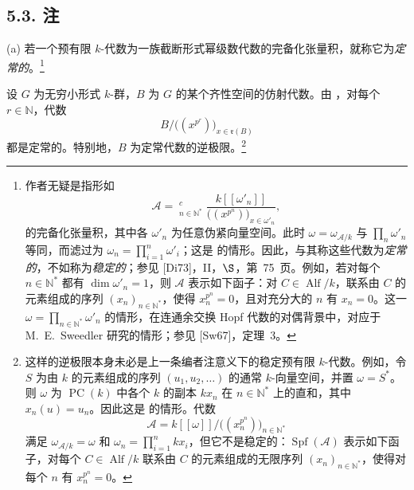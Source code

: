 
\subsection*{5.3. 注}
\label{sga3:VIIB:5.3}

\noindent{}\textup{(a)}
若一个预有限 \(k\)-代数为一族截断形式幂级数代数的完备化张量积，就称它为\emph{定常的}。\footnote{\label{sga3:VIIB:nde:165}作者无疑是指形如
\[
  \mathcal A
  =
  \mathop{\widehat{\bigotimes}}\nolimits^{c}_{n\in\mathbb N^*}
  \frac{k[[\omega'_n]]}
       {\bigl((x^{p^n})\bigr)_{x\in\omega'_n}},
\]
的完备化张量积，其中各 \(\omega'_n\) 为任意伪紧向量空间。此时 \(\omega=\omega_{\mathcal A/k}\) 与 \(\prod_n\omega'_n\) 等同，而滤过为 \(\omega_n=\prod_{i=1}^{n}\omega'_i\)；这是  的情形。因此，与其称这些代数为\emph{定常的}，不如称为\emph{稳定的}；参见 \textup{[Di73]}，II，\(\S\)，第~75~页。例如，若对每个 \(n\in\mathbb N^*\) 都有 \(\dim\omega'_n=1\)，则 \(\mathcal A\) 表示如下函子：对 \(C\in\operatorname{Alf}/k\)，联系由 \(C\) 的元素组成的序列 \((x_n)_{n\in\mathbb N^*}\)，使得 \(x_n^{p^n}=0\)，且对充分大的 \(n\) 有 \(x_n=0\)。这一 \(\omega=\prod_{n\in\mathbb N^*}\omega'_n\) 的情形，在连通余交换 Hopf 代数的对偶背景中，对应于 M.~E.~Sweedler 研究的情形；参见 \textup{[Sw67]}，定理~3。}

设 \(G\) 为无穷小形式 \(k\)-群，\(B\) 为 \(G\) 的某个齐性空间的仿射代数。由 ，对每个 \(r\in\mathbb N\)，代数
\[
  B
  \big/
  \bigl((x^{p^r})\bigr)_{x\in\mathfrak r(B)}
\]
都是定常的。特别地，\(B\) 为定常代数的逆极限。\footnote{\label{sga3:VIIB:nde:166}这样的逆极限本身未必是上一条编者注意义下的稳定预有限 \(k\)-代数。例如，令 \(S\) 为由 \(k\) 的元素组成的序列 \((u_1,u_2,\ldots)\) 的通常 \(k\)-向量空间，并置 \(\omega=S^*\)。则 \(\omega\) 为 \(\operatorname{PC}(k)\) 中各个 \(k\) 的副本 \(kx_n\) 在 \(n\in\mathbb N^*\) 上的直和，其中 \(x_n(u)=u_n\)。因此这是  的情形。代数
\[
  \mathcal A
  =
  k[[\omega]]
  \big/
  \bigl((x_n^{p^n})\bigr)_{n\in\mathbb N^*}
\]
满足 \(\omega_{\mathcal A/k}=\omega\) 和 \(\omega_n=\prod_{i=1}^{n}kx_i\)，但它不是稳定的：\(\operatorname{Spf}(\mathcal A)\) 表示如下函子，对每个 \(C\in\operatorname{Alf}/k\) 联系由 \(C\) 的元素组成的无限序列 \((x_n)_{n\in\mathbb N^*}\)，使得对每个 \(n\) 有 \(x_n^{p^n}=0\)。}

